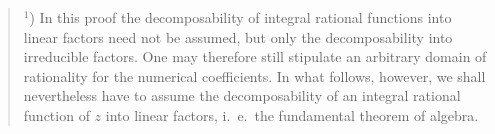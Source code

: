 
\begin{quote}
$^1$) In this proof the decomposability of integral rational functions into linear factors
need not be assumed, but only the decomposability into irreducible factors. One may
therefore still stipulate an arbitrary domain of rationality for the numerical
coefficients. In what follows, however, we shall nevertheless have to assume the
decomposability of an integral rational function of $z$ into linear factors, i.\ e.\ the
fundamental theorem of algebra.
\end{quote}
